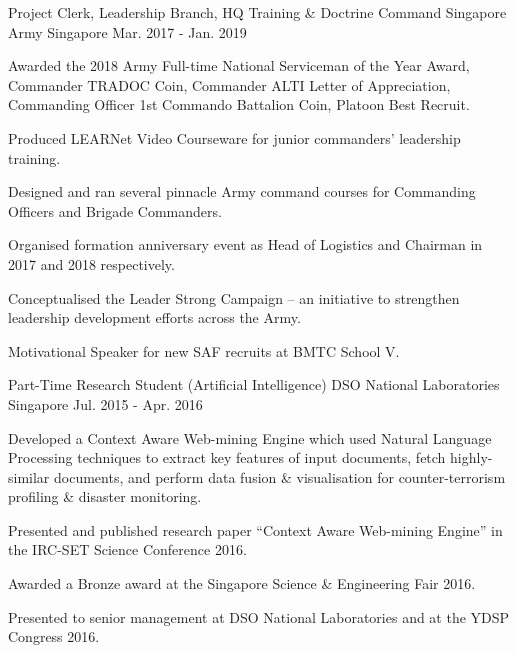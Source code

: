 

\begin{cventries}

  \cventry
    {Project Clerk, Leadership Branch, HQ Training \& Doctrine Command} %
    {Singapore Army} %
    {Singapore} %
    {Mar. 2017 - Jan. 2019} %
    {
      \begin{cvitems} %
        \item {Awarded the 2018 Army Full-time National Serviceman of the Year Award, Commander TRADOC Coin, Commander ALTI Letter of Appreciation, Commanding Officer 1st Commando Battalion Coin, Platoon Best Recruit.}
        \item {Produced LEARNet Video Courseware for junior commanders' leadership training.}
        \item {Designed and ran several pinnacle Army command courses for Commanding Officers and Brigade Commanders.}
        \item {Organised formation anniversary event as Head of Logistics and Chairman in 2017 and 2018 respectively.}
        \item {Conceptualised the Leader Strong Campaign – an initiative to strengthen leadership development efforts across the Army.}
        \item {Motivational Speaker for new SAF recruits at BMTC School V.}
      \end{cvitems}
    }

  \cventry
    {Part-Time Research Student (Artificial Intelligence)} %
    {DSO National Laboratories} %
    {Singapore} %
    {Jul. 2015 - Apr. 2016} %
    {
      \begin{cvitems} %
        \item {Developed a Context Aware Web-mining Engine which used Natural Language Processing techniques to extract key features of input documents, fetch highly-similar documents, and perform data fusion \& visualisation for counter-terrorism profiling \& disaster monitoring.}
        \item {Presented and published research paper “Context Aware Web-mining Engine” in the IRC-SET Science Conference 2016.}
        \item {Awarded a Bronze award at the Singapore Science \& Engineering Fair 2016.}
        \item {Presented to senior management at DSO National Laboratories and at the YDSP Congress 2016.}
      \end{cvitems}
    }


\end{cventries}
